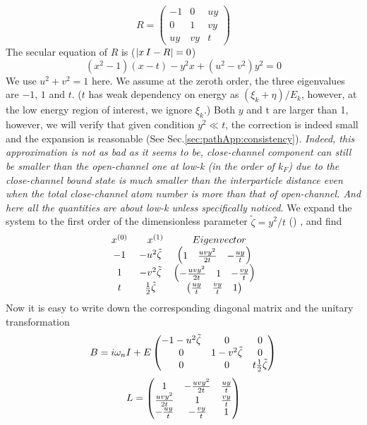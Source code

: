 \begin{equation*}
R=
\begin{pmatrix}
-1&0&uy\\
0&1&vy\\
uy&vy&t
\end{pmatrix}
\end{equation*}
The secular equation of $R$ is ($\left\lvert{x\,I-R}\right\rvert=0$)
\begin{equation}\label{eq:pahtApp:secular}
(x^{2}-1)(x-t)-y^{2}x+(u^{2}-v^{2})y^{2}=0
\end{equation}
We use $u^{2}+v^{2}=1$ here.  We  assume at the zeroth order, the three eigenvalues are $-1$, $1$ and $t$.  ($t$ has weak dependency on energy as $(\xi_{k}+\eta)/E_{k}$, however, at the low energy region of interest, we ignore $\xi_{k}$.) Both $y$ and t are larger than 1, however, we will verify that given condition $y^{2}\ll{t}$, the correction is indeed small and the expansion is reasonable (See Sec.\ref{sec:pathApp:consistency}).  \emph{Indeed, this approximation is not as bad as it seems to be, close-channel component can still be smaller than the open-channel one at low-k (in the order of $k_{F}$)  due to the close-channel bound state is much smaller than the interparticle distance even when the total close-channel atom number  is more than that of open-channel.  And here all the quantities are about low-k unless specifically noticed.} 
We expand the system to the first order of the dimensionless parameter $\tilde\zeta=y^{2}/{t}$ ()%
, and find
\begin{equation}
\begin{array}{ccc}
x^{(0)}&\quad{}x^{(1)}&\quad{}Eigenvector\nonumber\\
-1&-u^{2}\tilde\zeta&\begin{pmatrix}1&\frac{uvy^{2}}{2t}&-\frac{uy}{t}\end{pmatrix}\\
1&-v^{2}\tilde\zeta&\begin{pmatrix}-\frac{uvy^{2}}{2t}&1&-\frac{vy}{t}\end{pmatrix}\\
t&\frac{1}{2}\tilde\zeta&\begin{pmatrix}\frac{uy}{t}&\frac{vy}{t}&1\end{pmatrix}
\end{array}
\end{equation}
Now it is easy to write down the corresponding diagonal matrix and the unitary transformation
\begin{equation}
B=i\omega_{n}I+E\begin{pmatrix}-1-u^{2}\tilde\zeta&0&0\\0&1-v^{2}\tilde\zeta&0\\0&0&t\frac{1}{2}\tilde\zeta\end{pmatrix}
\end{equation}
\begin{equation}
L=\begin{pmatrix}1&-\frac{uvy^{2}}{2t}&\frac{uy}{t}\\\frac{uvy^{2}}{2t}&1&\frac{vy}{t}\\-\frac{uy}{t}&-\frac{vy}{t}&1\end{pmatrix}
\end{equation}
